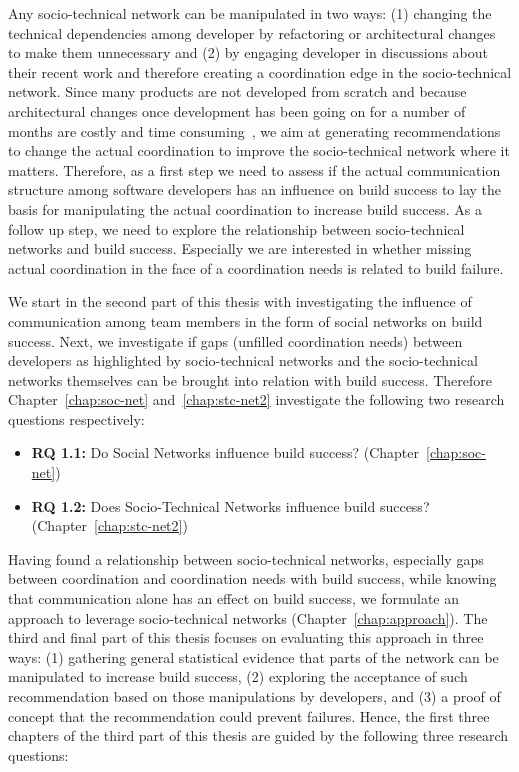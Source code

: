 Any socio-technical network can be manipulated in two ways: (1) changing the technical dependencies among developer by refactoring or architectural changes to make them unnecessary and (2) by engaging developer in discussions about their recent work and therefore creating a coordination edge in the socio-technical network.
Since many products are not developed from scratch and because architectural changes once development has been going on for a number of months are costly and time consuming~\cite{vangurp:jss:2002}, we aim at generating recommendations to change the actual coordination to improve the socio-technical network where it matters.
Therefore, as a first step we need to assess if the actual communication structure among software developers has an influence on build success to lay the basis for manipulating the actual coordination to increase build success.
As a follow up step, we need to explore the relationship between socio-technical networks and build success.
Especially we are interested in whether missing actual coordination in the face of a coordination needs is related to build failure.

We start in the second part of this thesis with investigating the influence of communication among team members in the form of social networks on build success.
Next, we investigate if gaps (unfilled coordination needs) between developers as highlighted by socio-technical networks and the socio-technical networks themselves can be brought into relation with build success.
Therefore Chapter~\ref{chap:soc-net} and~\ref{chap:stc-net2} investigate the following two research questions respectively:

\begin{itemize}
  \item\textbf{RQ 1.1:} Do Social Networks influence build success? (Chapter~\ref{chap:soc-net})
  \item\textbf{RQ 1.2:} Does Socio-Technical Networks influence build success? (Chapter~\ref{chap:stc-net2})
\end{itemize}

Having found a relationship between socio-technical networks, especially gaps between coordination and coordination needs with build success, while knowing that communication alone has an effect on build success, we formulate an approach to leverage socio-technical networks (Chapter~\ref{chap:approach}).
The third and final part of this thesis focuses on evaluating this approach in three ways:
(1) gathering general statistical evidence that parts of the network can be manipulated to increase build success,
(2) exploring the acceptance of such recommendation based on those manipulations by developers,
and (3) a proof of concept that the recommendation could prevent failures.
Hence, the first three chapters of the third part of this thesis are guided by the following three research questions:

